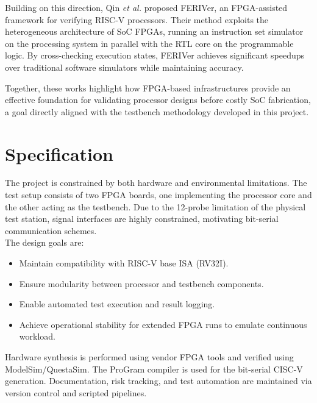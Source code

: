 \documentclass[10pt,twocolumn]{article}
\begin{document}
Building on this direction, Qin \textit{et al.} \cite{qin2025feriver} proposed FERIVer, an FPGA-assisted framework for verifying RISC-V processors. Their method exploits the heterogeneous architecture of SoC FPGAs, running an instruction set simulator on the processing system in parallel with the RTL core on the programmable logic. By cross-checking execution states, FERIVer achieves significant speedups over traditional software simulators while maintaining accuracy. 

Together, these works highlight how FPGA-based infrastructures provide an effective foundation for validating processor designs before costly SoC fabrication, a goal directly aligned with the testbench methodology developed in this project.


\section{Specification}
The project is constrained by both hardware and environmental limitations. The test setup consists of two FPGA boards, one implementing the processor core and the other acting as the testbench. Due to the 12-probe limitation of the physical test station, signal interfaces are highly constrained, motivating bit-serial communication schemes.\\
The design goals are:\\
\begin{itemize}
    \item Maintain compatibility with RISC-V base ISA (RV32I).
    \item Ensure modularity between processor and testbench components.
    \item Enable automated test execution and result logging.
    \item Achieve operational stability for extended FPGA runs to emulate continuous workload.
\end{itemize}
Hardware synthesis is performed using vendor FPGA tools and verified using ModelSim/QuestaSim. The ProGram compiler is used for the bit-serial CISC-V generation. Documentation, risk tracking, and test automation are maintained via version control and scripted pipelines.\\
\end{document}
